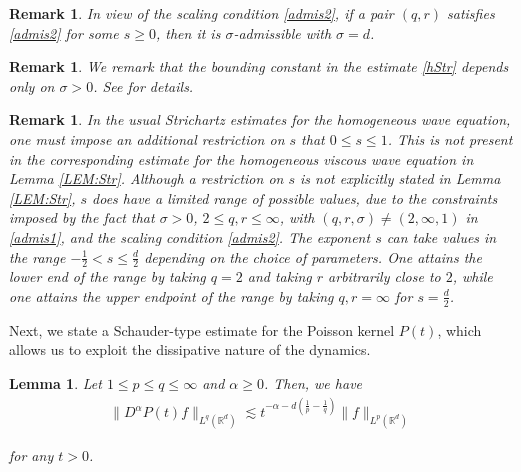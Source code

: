 \documentclass[letterpaper, 11pt,  reqno]{amsart}
\newtheorem{lemma}[theorem]{Lemma}
\newtheorem{remark}[theorem]{Remark}
\newcommand{\1}{\hspace{0.5mm}\text{I}\hspace{0.2mm}}
\newcommand{\noi}{\noindent}
\newcommand{\R}{\mathbb{R}}
\newcommand{\al}{\alpha}
\newcommand{\s}{\sigma}
\newcommand{\les}{\lesssim}
\numberwithin{equation}{section}
\numberwithin{theorem}{section}
\begin{document}
\begin{remark}\rm
In view of the scaling condition \eqref{admis2}, 
if a pair $(q, r)$ satisfies \eqref{admis2}
for some $s \geq 0$, 
then it is $\s$-admissible with $\s = d$.
\end{remark}

\begin{remark}\rm
We remark that the bounding constant in the estimate \eqref{hStr} depends only on $\sigma > 0$. See \cite{KC} for details.
\end{remark}

\begin{remark}\rm
In the usual Strichartz estimates for the homogeneous wave equation, one must impose an additional restriction on $s$ that $0 \le s \le 1$. This is not present in the corresponding estimate for the homogeneous viscous wave equation in Lemma \ref{LEM:Str}. Although a restriction on $s$ is not explicitly stated in Lemma \ref{LEM:Str}, $s$ does have a limited range of possible values, due to the constraints imposed by the fact that $\sigma > 0$, $2 \le q, r \le \infty$, with $(q, r, \sigma) \ne (2, \infty, 1)$ in \eqref{admis1}, and the scaling condition \eqref{admis2}. The exponent $s$ can take values in the range 
$-\frac 12 < s \le \frac d2$ depending on the choice of parameters. One attains the lower end of the range by taking $q = 2$ and taking $r$ arbitrarily close to $2$, while one attains the upper endpoint of the range by taking $q, r = \infty$ for $s = \frac d2$.
\end{remark}



Next, we state a Schauder-type estimate for the Poisson kernel $P(t)$, 
which allows us to exploit the dissipative nature of
the dynamics.

\begin{lemma}\label{LEM:Sch}
Let $ 1 \leq p \leq q \leq \infty$
and $\al \geq 0$.
Then, we have
\begin{align}
\| D^\al P(t) f\|_{L^q(\R^d)} \les
t^{- \al - d(\frac{1}{p} - \frac{1}{q})}\| f\|_{L^p(\R^d)} 
\label{P1}
\end{align}


\noi
for any $t > 0$.
\end{lemma}
\end{document}
